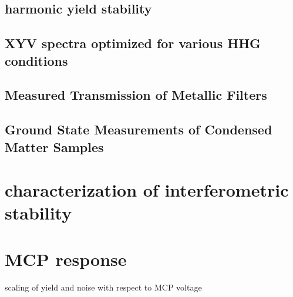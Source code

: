 \subsection{harmonic yield stability}

\subsection{XYV spectra optimized for various HHG conditions}

\subsection{Measured Transmission of Metallic Filters}

\subsection{Ground State Measurements of Condensed Matter Samples}

\section{characterization of interferometric stability}

\section{MCP response}

scaling of yield and noise with respect to MCP voltage